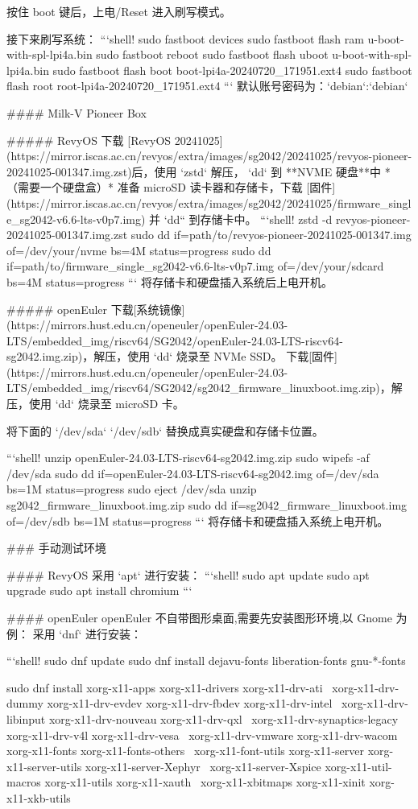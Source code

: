 \documentclass{article}
\begin{document}
\begin{markdown}
按住 boot 键后，上电/Reset 进入刷写模式。

接下来刷写系统：
```shell!
sudo fastboot devices
sudo fastboot flash ram u-boot-with-spl-lpi4a.bin 
sudo fastboot reboot
sudo fastboot flash uboot u-boot-with-spl-lpi4a.bin
sudo fastboot flash boot boot-lpi4a-20240720_171951.ext4
sudo fastboot flash root root-lpi4a-20240720_171951.ext4
```
默认账号密码为：`debian`:`debian`

#### Milk-V Pioneer Box

##### RevyOS
下载 [RevyOS 20241025](https://mirror.iscas.ac.cn/revyos/extra/images/sg2042/20241025/revyos-pioneer-20241025-001347.img.zst)后，使用 `zstd` 解压， `dd` 到 **NVME 硬盘**中 *（需要一个硬盘盒）*
准备 microSD 读卡器和存储卡，下载 [固件](https://mirror.iscas.ac.cn/revyos/extra/images/sg2042/20241025/firmware_single_sg2042-v6.6-lts-v0p7.img) 并 `dd`` 到存储卡中。
```shell!
zstd -d revyos-pioneer-20241025-001347.img.zst
sudo dd if=path/to/revyos-pioneer-20241025-001347.img of=/dev/your/nvme bs=4M status=progress
sudo dd if=path/to/firmware_single_sg2042-v6.6-lts-v0p7.img of=/dev/your/sdcard bs=4M status=progress
```
将存储卡和硬盘插入系统后上电开机。

##### openEuler
下载[系统镜像](https://mirrors.hust.edu.cn/openeuler/openEuler-24.03-LTS/embedded_img/riscv64/SG2042/openEuler-24.03-LTS-riscv64-sg2042.img.zip)，解压，使用 `dd` 烧录至 NVMe SSD。
下载[固件](https://mirrors.hust.edu.cn/openeuler/openEuler-24.03-LTS/embedded_img/riscv64/SG2042/sg2042_firmware_linuxboot.img.zip)，解压，使用 `dd` 烧录至 microSD 卡。

将下面的 `/dev/sda` `/dev/sdb` 替换成真实硬盘和存储卡位置。

```shell!
unzip openEuler-24.03-LTS-riscv64-sg2042.img.zip
sudo wipefs -af /dev/sda
sudo dd if=openEuler-24.03-LTS-riscv64-sg2042.img of=/dev/sda bs=1M status=progress
sudo eject /dev/sda
unzip sg2042_firmware_linuxboot.img.zip
sudo dd if=sg2042_firmware_linuxboot.img of=/dev/sdb bs=1M status=progress
```
将存储卡和硬盘插入系统上电开机。

### 手动测试环境

#### RevyOS
采用 `apt` 进行安装：
```shell!
sudo apt update
sudo apt upgrade
sudo apt install chromium
```

#### openEuler
openEuler 不自带图形桌面,需要先安装图形环境,以 Gnome 为例：
采用 `dnf` 进行安装：

```shell!
sudo dnf update
sudo dnf install dejavu-fonts liberation-fonts gnu-*-fonts

sudo dnf install xorg-x11-apps xorg-x11-drivers xorg-x11-drv-ati \
 xorg-x11-drv-dummy xorg-x11-drv-evdev xorg-x11-drv-fbdev xorg-x11-drv-intel \
 xorg-x11-drv-libinput xorg-x11-drv-nouveau xorg-x11-drv-qxl \
 xorg-x11-drv-synaptics-legacy xorg-x11-drv-v4l xorg-x11-drv-vesa \
 xorg-x11-drv-vmware xorg-x11-drv-wacom xorg-x11-fonts xorg-x11-fonts-others \
 xorg-x11-font-utils xorg-x11-server xorg-x11-server-utils xorg-x11-server-Xephyr \
 xorg-x11-server-Xspice xorg-x11-util-macros xorg-x11-utils xorg-x11-xauth \
 xorg-x11-xbitmaps xorg-x11-xinit xorg-x11-xkb-utils


\end{markdown}
\end{document}
